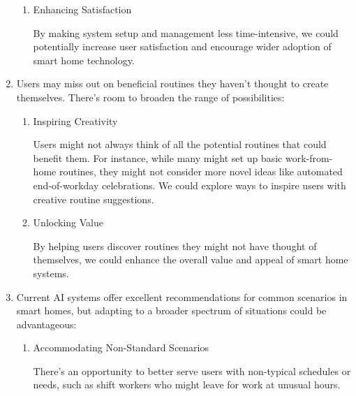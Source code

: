 \documentclass[conference]{IEEEtran}
\begin{document}
\begin{enumerate}[label=\arabic*]
\begin{enumerate}[label=\arabic*)]
        \item Enhancing Satisfaction\par
        \vspace{0.3em}
        By making system setup and management less time-intensive, we could potentially increase user satisfaction and encourage wider adoption of smart home technology.
    \end{enumerate}

    \vspace{1em}

    \item Users may miss out on beneficial routines they haven't thought to create themselves. There's room to broaden the range of possibilities:
    \vspace{0.3em}

    \begin{enumerate}[label=\arabic*)]
        \item Inspiring Creativity\par
        \vspace{0.3em}
        Users might not always think of all the potential routines that could benefit them. For instance, while many might set up basic work-from-home routines, they might not consider more novel ideas like automated end-of-workday celebrations. We could explore ways to inspire users with creative routine suggestions.

        \vspace{0.5em}

        \item Unlocking Value\par
        \vspace{0.3em}
        By helping users discover routines they might not have thought of themselves, we could enhance the overall value and appeal of smart home systems.
    \end{enumerate}

    \vspace{1em}

    \item Current AI systems offer excellent recommendations for common scenarios in smart homes, but adapting to a broader spectrum of situations could be advantageous:
    \vspace{0.3em}

    \begin{enumerate}[label=\arabic*)]
        \item Accommodating Non-Standard Scenarios\par
        \vspace{0.3em}
        There's an opportunity to better serve users with non-typical schedules or needs, such as shift workers who might leave for work at unusual hours.


\end{enumerate}
\end{enumerate}
\end{document}
